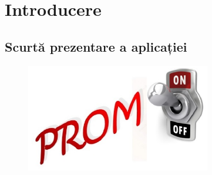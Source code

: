 \chapter{Introducere}

\section{Scurtă prezentare a aplicației}
\vspace{0.8cm}
\begin{center}
\begin{figure}[htbp]
\includegraphics[width=0.72\textwidth]
{imagini/promonnou.eps}
\end{figure}
\end{center}
